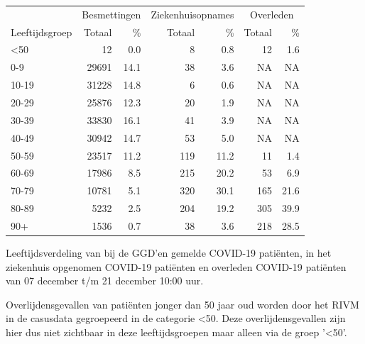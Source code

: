 \documentclass[
  english,
  man,floatsintext]{apa6}
\begin{document}
\begin{table}
\centering\begingroup\fontsize{11}{13}\selectfont

\begin{threeparttable}
\begin{tabular}{lrrrrrr}
\toprule
\multicolumn{1}{c}{ } & \multicolumn{2}{c}{Besmettingen} & \multicolumn{2}{c}{Ziekenhuisopnames} & \multicolumn{2}{c}{Overleden} \\
\cmidrule(l{3pt}r{3pt}){2-3} \cmidrule(l{3pt}r{3pt}){4-5} \cmidrule(l{3pt}r{3pt}){6-7}
Leeftijdsgroep & Totaal & \% & Totaal & \% & Totaal & \%\\
\midrule
<50 & 12 & 0.0 & 8 & 0.8 & 12 & 1.6\\
0-9 & 29691 & 14.1 & 38 & 3.6 & NA & NA\\
10-19 & 31228 & 14.8 & 6 & 0.6 & NA & NA\\
20-29 & 25876 & 12.3 & 20 & 1.9 & NA & NA\\
30-39 & 33830 & 16.1 & 41 & 3.9 & NA & NA\\
40-49 & 30942 & 14.7 & 53 & 5.0 & NA & NA\\
50-59 & 23517 & 11.2 & 119 & 11.2 & 11 & 1.4\\
60-69 & 17986 & 8.5 & 215 & 20.2 & 53 & 6.9\\
70-79 & 10781 & 5.1 & 320 & 30.1 & 165 & 21.6\\
80-89 & 5232 & 2.5 & 204 & 19.2 & 305 & 39.9\\
90+ & 1536 & 0.7 & 38 & 3.6 & 218 & 28.5\\
\bottomrule
\end{tabular}
\begin{tablenotes}
\item[1] Leeftijdsverdeling van bij de GGD’en gemelde COVID-19 patiënten, in het ziekenhuis opgenomen COVID-19 patiënten en overleden COVID-19 patiënten van 07 december t/m 21 december 10:00 uur.
\item[2] Overlijdensgevallen van patiënten jonger dan 50 jaar oud worden door het RIVM in de casusdata gegroepeerd in de categorie <50. Deze overlijdensgevallen zijn hier dus niet zichtbaar in deze leeftijdsgroepen maar alleen via de groep '<50'.
\end{tablenotes}
\end{threeparttable}
\endgroup{}
\end{table}

\newpage
\end{document}
